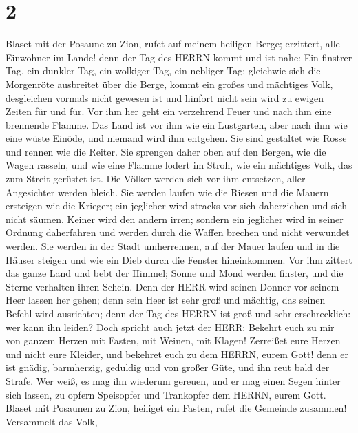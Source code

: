 \hypertarget{section-1}{%
\section{2}\label{section-1}}

 Blaset mit der Posaune zu Zion, rufet auf meinem heiligen
Berge; erzittert, alle Einwohner im Lande! denn der Tag des HERRN kommt
und ist nahe:  Ein finstrer Tag, ein dunkler Tag, ein
wolkiger Tag, ein nebliger Tag; gleichwie sich die Morgenröte ausbreitet
über die Berge, kommt ein großes und mächtiges Volk, desgleichen vormals
nicht gewesen ist und hinfort nicht sein wird zu ewigen Zeiten für und
für.  Vor ihm her geht ein verzehrend Feuer und nach ihm
eine brennende Flamme. Das Land ist vor ihm wie ein Lustgarten, aber
nach ihm wie eine wüste Einöde, und niemand wird ihm entgehen.
 Sie sind gestaltet wie Rosse und rennen wie die Reiter.
 Sie sprengen daher oben auf den Bergen, wie die Wagen
rasseln, und wie eine Flamme lodert im Stroh, wie ein mächtiges Volk,
das zum Streit gerüstet ist.  Die Völker werden sich vor ihm
entsetzen, aller Angesichter werden bleich.  Sie werden
laufen wie die Riesen und die Mauern ersteigen wie die Krieger; ein
jeglicher wird stracks vor sich daherziehen und sich nicht säumen.
 Keiner wird den andern irren; sondern ein jeglicher wird in
seiner Ordnung daherfahren und werden durch die Waffen brechen und nicht
verwundet werden.  Sie werden in der Stadt umherrennen, auf
der Mauer laufen und in die Häuser steigen und wie ein Dieb durch die
Fenster hineinkommen.  Vor ihm zittert das ganze Land und
bebt der Himmel; Sonne und Mond werden finster, und die Sterne verhalten
ihren Schein.  Denn der HERR wird seinen Donner vor seinem
Heer lassen her gehen; denn sein Heer ist sehr groß und mächtig, das
seinen Befehl wird ausrichten; denn der Tag des HERRN ist groß und sehr
erschrecklich: wer kann ihn leiden?  Doch spricht auch
jetzt der HERR: Bekehrt euch zu mir von ganzem Herzen mit Fasten, mit
Weinen, mit Klagen!  Zerreißet eure Herzen und nicht eure
Kleider, und bekehret euch zu dem HERRN, eurem Gott! denn er ist gnädig,
barmherzig, geduldig und von großer Güte, und ihn reut bald der Strafe.
 Wer weiß, es mag ihn wiederum gereuen, und er mag einen
Segen hinter sich lassen, zu opfern Speisopfer und Trankopfer dem HERRN,
eurem Gott.  Blaset mit Posaunen zu Zion, heiliget ein
Fasten, rufet die Gemeinde zusammen!  Versammelt das Volk,
